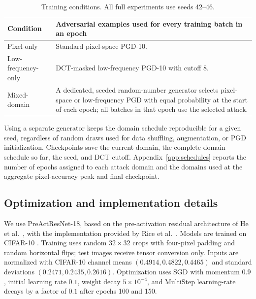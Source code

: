 \documentclass[11pt]{article}
\begin{document}
\begin{table}[htbp]
\centering
\caption{Training conditions. All full experiments use seeds 42--46.}
\label{tab:conditions}
\begin{tabularx}{\linewidth}{@{}lX@{}}
\toprule
Condition & Adversarial examples used for every training batch in an epoch \\
\midrule
Pixel-only & Standard pixel-space PGD-10. \\
Low-frequency-only & DCT-masked low-frequency PGD-10 with cutoff $8$. \\
Mixed-domain & A dedicated, seeded random-number generator selects pixel-space or
low-frequency PGD with equal probability at the start of each epoch; all
batches in that epoch use the selected attack. \\
\bottomrule
\end{tabularx}
\end{table}

Using a separate generator keeps the domain schedule reproducible for a given
seed, regardless of random draws used for data shuffling, augmentation, or
PGD initialization. Checkpoints save the current
domain, the complete domain schedule so far, the seed, and DCT cutoff.
Appendix~\ref{app:schedules} reports the number of epochs assigned to each
attack domain and the domains used at the aggregate pixel-accuracy peak and
final checkpoint.

\subsection{Optimization and implementation details}
\label{sec:implementation}
We use PreActResNet-18, based on the pre-activation residual architecture of
He et al.~\cite{he2016}, with the implementation provided by Rice
et al.~\cite{rice2020}. Models are trained on CIFAR-10
\cite{krizhevsky2009}. Training uses
random $32\times32$ crops with four-pixel padding and random horizontal flips;
test images receive tensor conversion only. Inputs are normalized with CIFAR-10
channel means $(0.4914,0.4822,0.4465)$ and standard deviations
$(0.2471,0.2435,0.2616)$. Optimization uses SGD with momentum $0.9$, initial
learning rate $0.1$, weight decay $5\times10^{-4}$, and MultiStep learning-rate
decays by a factor of $0.1$ after epochs 100 and 150.
\end{document}
